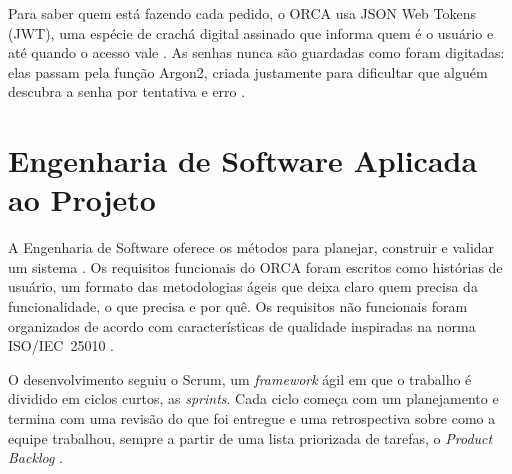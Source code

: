 \documentclass[
    12pt,           %
    oneside,        %
    a4paper,        %
    chapter=TITLE,  %
    english,        %
    brazil          %
]{abntex2}
\begin{document}
Para saber quem está fazendo cada pedido, o ORCA usa JSON Web Tokens (JWT),
uma espécie de crachá digital assinado que informa quem é o usuário e até
quando o acesso vale \cite{rfc7519}. As senhas nunca são guardadas como foram
digitadas: elas passam pela função Argon2, criada justamente para dificultar
que alguém descubra a senha por tentativa e erro \cite{rfc9106}.

\section{Engenharia de Software Aplicada ao Projeto}

A Engenharia de Software oferece os métodos para planejar, construir e
validar um sistema \cite{sommerville2019}. Os requisitos funcionais do ORCA
foram escritos como histórias de usuário, um formato das metodologias ágeis
que deixa claro quem precisa da funcionalidade, o que precisa e por quê. Os
requisitos não funcionais foram organizados de acordo com características de
qualidade inspiradas na norma ISO/IEC~25010 \cite{iso25010}.

O desenvolvimento seguiu o Scrum, um \textit{framework} ágil em que o
trabalho é dividido em ciclos curtos, as \textit{sprints}. Cada ciclo começa
com um planejamento e termina com uma revisão do que foi entregue e uma
retrospectiva sobre como a equipe trabalhou, sempre a partir de uma lista
priorizada de tarefas, o \textit{Product Backlog} \cite{scrumguide2020}.

\newenvironment{dadoslista}{%
  \begin{itemize}%
  \setlength{\leftmargin}{1.1em}\setlength{\labelwidth}{0.7em}%
  \setlength{\labelsep}{0.4em}\setlength{\itemsep}{0pt}%
  \setlength{\parsep}{0pt}\setlength{\topsep}{0pt}\setlength{\partopsep}{0pt}}%
  {\end{itemize}}

\newcommand{\reqfunc}[5]{%
  \par\smallskip
  \begingroup
  \SingleSpacing\footnotesize
  \renewcommand{\arraystretch}{1.15}%
  \noindent
  \begin{tabular}{|p{2.3cm}|p{12.7cm}|}
  \hline
  \multicolumn{2}{|l|}{\textbf{#1 -- #2}} \\ \hline
  \textbf{Descrição Geral} & #3 \\ \hline
  \textbf{Atores} & #4 \\ \hline
  \textbf{Informações / Dados} & #5 \\ \hline
  \end{tabular}
  \endgroup
  \par\smallskip}
\end{document}

